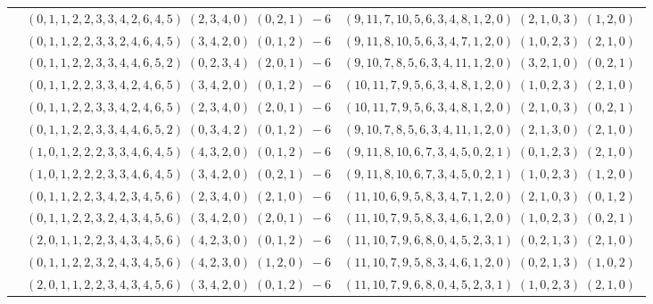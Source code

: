 \documentclass[11pt]{article}
\begin{document}
\begin{longtable}[l]{|c|c|c|}
 \cline{2-3} 
 & $(0 ,1 ,1 ,2 ,2 ,3 ,3 ,4 ,2 ,6 ,4 ,5) \;(2 ,3 ,4 ,0) \;(0 ,2 ,1) \;-6$ & $(9 ,11 ,7 ,10 ,5 ,6 ,3 ,4 ,8 ,1 ,2 ,0) \;(2 ,1 ,0 ,3) \;(1 ,2 ,0) \;$\\ 
 \cline{2-3} 
 & $(0 ,1 ,1 ,2 ,2 ,3 ,3 ,2 ,4 ,6 ,4 ,5) \;(3 ,4 ,2 ,0) \;(0 ,1 ,2) \;-6$ & $(9 ,11 ,8 ,10 ,5 ,6 ,3 ,4 ,7 ,1 ,2 ,0) \;(1 ,0 ,2 ,3) \;(2 ,1 ,0) \;$\\ 
 \cline{2-3} 
 & $(0 ,1 ,1 ,2 ,2 ,3 ,3 ,4 ,4 ,6 ,5 ,2) \;(0 ,2 ,3 ,4) \;(2 ,0 ,1) \;-6$ & $(9 ,10 ,7 ,8 ,5 ,6 ,3 ,4 ,11 ,1 ,2 ,0) \;(3 ,2 ,1 ,0) \;(0 ,2 ,1) \;$\\ 
 \cline{2-3} 
 & $(0 ,1 ,1 ,2 ,2 ,3 ,3 ,4 ,2 ,4 ,6 ,5) \;(3 ,4 ,2 ,0) \;(0 ,1 ,2) \;-6$ & $(10 ,11 ,7 ,9 ,5 ,6 ,3 ,4 ,8 ,1 ,2 ,0) \;(1 ,0 ,2 ,3) \;(2 ,1 ,0) \;$\\ 
 \cline{2-3} 
 & $(0 ,1 ,1 ,2 ,2 ,3 ,3 ,4 ,2 ,4 ,6 ,5) \;(2 ,3 ,4 ,0) \;(2 ,0 ,1) \;-6$ & $(10 ,11 ,7 ,9 ,5 ,6 ,3 ,4 ,8 ,1 ,2 ,0) \;(2 ,1 ,0 ,3) \;(0 ,2 ,1) \;$\\ 
 \cline{2-3} 
 & $(0 ,1 ,1 ,2 ,2 ,3 ,3 ,4 ,4 ,6 ,5 ,2) \;(0 ,3 ,4 ,2) \;(0 ,1 ,2) \;-6$ & $(9 ,10 ,7 ,8 ,5 ,6 ,3 ,4 ,11 ,1 ,2 ,0) \;(2 ,1 ,3 ,0) \;(2 ,1 ,0) \;$\\ 
 \cline{2-3} 
 & $(1 ,0 ,1 ,2 ,2 ,2 ,3 ,3 ,4 ,6 ,4 ,5) \;(4 ,3 ,2 ,0) \;(0 ,1 ,2) \;-6$ & $(9 ,11 ,8 ,10 ,6 ,7 ,3 ,4 ,5 ,0 ,2 ,1) \;(0 ,1 ,2 ,3) \;(2 ,1 ,0) \;$\\ 
 \cline{2-3} 
 & $(1 ,0 ,1 ,2 ,2 ,2 ,3 ,3 ,4 ,6 ,4 ,5) \;(3 ,4 ,2 ,0) \;(0 ,2 ,1) \;-6$ & $(9 ,11 ,8 ,10 ,6 ,7 ,3 ,4 ,5 ,0 ,2 ,1) \;(1 ,0 ,2 ,3) \;(1 ,2 ,0) \;$\\ 
 \cline{2-3} 
 & $(0 ,1 ,1 ,2 ,2 ,3 ,4 ,2 ,3 ,4 ,5 ,6) \;(2 ,3 ,4 ,0) \;(2 ,1 ,0) \;-6$ & $(11 ,10 ,6 ,9 ,5 ,8 ,3 ,4 ,7 ,1 ,2 ,0) \;(2 ,1 ,0 ,3) \;(0 ,1 ,2) \;$\\ 
 \cline{2-3} 
 & $(0 ,1 ,1 ,2 ,2 ,3 ,2 ,4 ,3 ,4 ,5 ,6) \;(3 ,4 ,2 ,0) \;(2 ,0 ,1) \;-6$ & $(11 ,10 ,7 ,9 ,5 ,8 ,3 ,4 ,6 ,1 ,2 ,0) \;(1 ,0 ,2 ,3) \;(0 ,2 ,1) \;$\\ 
 \cline{2-3} 
 & $(2 ,0 ,1 ,1 ,2 ,2 ,3 ,4 ,3 ,4 ,5 ,6) \;(4 ,2 ,3 ,0) \;(0 ,1 ,2) \;-6$ & $(11 ,10 ,7 ,9 ,6 ,8 ,0 ,4 ,5 ,2 ,3 ,1) \;(0 ,2 ,1 ,3) \;(2 ,1 ,0) \;$\\ 
 \cline{2-3} 
 & $(0 ,1 ,1 ,2 ,2 ,3 ,2 ,4 ,3 ,4 ,5 ,6) \;(4 ,2 ,3 ,0) \;(1 ,2 ,0) \;-6$ & $(11 ,10 ,7 ,9 ,5 ,8 ,3 ,4 ,6 ,1 ,2 ,0) \;(0 ,2 ,1 ,3) \;(1 ,0 ,2) \;$\\ 
 \cline{2-3} 
 & $(2 ,0 ,1 ,1 ,2 ,2 ,3 ,4 ,3 ,4 ,5 ,6) \;(3 ,4 ,2 ,0) \;(0 ,1 ,2) \;-6$ & $(11 ,10 ,7 ,9 ,6 ,8 ,0 ,4 ,5 ,2 ,3 ,1) \;(1 ,0 ,2 ,3) \;(2 ,1 ,0) \;$\\ 

\end{longtable}
\end{document}
